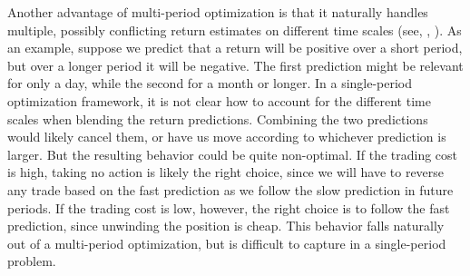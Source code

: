 \documentclass[openany]{now}
\begin{document}
Another advantage of multi-period optimization is that it naturally
handles multiple, possibly conflicting return estimates on different
time scales (see, \eg, \cite{garleanu2013dynamic, nystrup2016dynamic}).
As an example, suppose we predict that a return will be positive
over a short period, but over a longer period it will be negative.
The first prediction might be relevant for only a day, while the second
for a month or longer.
In a single-period optimization framework, it is not clear how to account
for the different time scales when blending the return predictions.
Combining the two predictions would likely cancel them, or have us move
according to whichever prediction is larger.
But the resulting behavior could be quite non-optimal.
If the trading cost is high, taking no action is likely
the right choice, since we will have to reverse any trade based on
the fast prediction as we follow the slow prediction in future periods.
If the trading cost is low, however, the right choice is to
follow the fast prediction, since unwinding the position is cheap.
This behavior falls naturally out of a multi-period optimization,
but is difficult to capture in a single-period problem.
\end{document}
